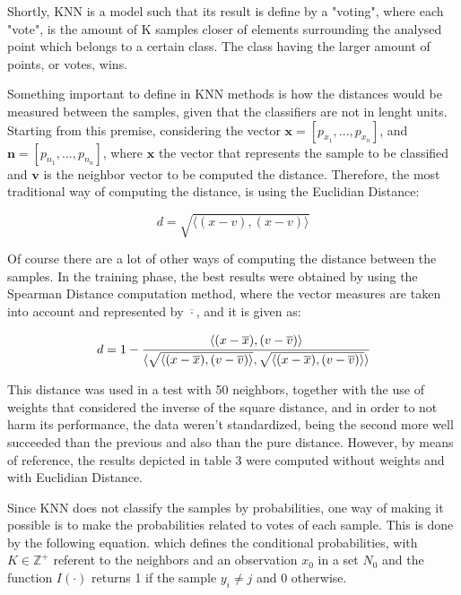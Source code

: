\documentclass[conference]{IEEEtran}
\begin{document}
Shortly, KNN is a model such that its result is define by a "voting", where each "vote", 
is the amount of K samples closer of elements surrounding the analysed point which belongs
to a certain class. The class having the larger amount of points, or votes, wins. 

Something important to define in KNN methods is how the distances would be measured between
the samples, given that the classifiers are not in lenght units. Starting from this premise,
considering the vector $\textbf{x} = [p_{x_1}, ..., p_{x_n}]$, and $\textbf{n} = [p_{n_1}, ..., p_{n_n}]$, 
where $\textbf{x}$ the vector that represents the sample to be classified and $\textbf{v}$
is the neighbor vector to be computed the distance. Therefore, the most traditional way 
of computing the distance, is using the Euclidian Distance:

\begin{equation}
    d = \sqrt{\langle (x-v), (x-v)\rangle} \label{eq16}
\end{equation}

Of course there are a lot of other ways of computing the distance between the samples. 
In the training phase, the best results were obtained by using the Spearman Distance computation
method, where the vector measures are taken into account and represented by $\overline{\cdot}$, and it is 
given as: 

\begin{equation}
    d = 1 - \cfrac{\langle (x-\overline{x}), (v - \overline{v})\rangle}{\langle \sqrt{\langle (x-\overline{x}), (v - \overline{v})\rangle}, \sqrt{\langle (x-\overline{x}), (v - \overline{v})\rangle}\rangle}
\end{equation}

This distance was used in a test with 50 neighbors, together with the use of weights that
considered the inverse of the square distance, and in order to not harm its performance, the data weren't standardized, being the second more well succeeded than
the previous and also than the pure distance. However, by means of reference, the results 
depicted in table 3 were computed without weights and with Euclidian Distance.

Since KNN does not classify the samples by probabilities, one way of making it possible is to 
make the probabilities related to votes of each sample. This is done by the following 
equation. which defines the conditional probabilities, with $K \in \mathbb{Z}^{+}$ referent 
to the neighbors and an observation $x_0$ in a set $N_0$ and the function $I(\cdot)$
returns 1 if the sample $y_i \neq j$ and 0 otherwise.
\end{document}
